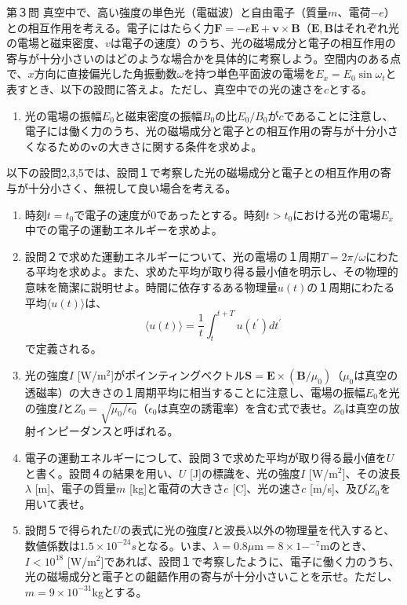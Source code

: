 \documentclass[fleqn]{jbook}
\begin{document}
\begin{question}{第３問}{}
真空中で、高い強度の単色光（電磁波）と自由電子（質量$m$、電荷$-e$）との相互作用を考える。電子にはたらく力$\mathbf{F}=-e\mathbf{E}+\mathbf{v}\times \mathbf{B}$（$\bm{E},\bm{B}$はそれぞれ光の電場と磁束密度、$v$は電子の速度）のうち、光の磁場成分と電子の相互作用の寄与が十分小さいのはどのような場合かを具体的に考察しよう。空間内のある点で、$x$方向に直接偏光した角振動数$\omega$を持つ単色平面波の電場を$E_x=E_0 \sin \omega_t$と表すとき、以下の設問に答えよ。ただし、真空中での光の速さを$c$とする。
\begin{enumerate}
\item 光の電場の振幅$E_0$と磁束密度の振幅$B_0$の比$E_0/B_0$が$c$であることに注意し、電子には働く力のうち、光の磁場成分と電子との相互作用の寄与が十分小さくなるための$\bm{v}$の大きさに関する条件を求めよ。
\end{enumerate}
以下の設問2,3,5では、設問１で考察した光の磁場成分と電子との相互作用の寄与が十分小さく、無視して良い場合を考える。
\setcounter{enumi}{2}
\begin{enumerate}
\item 時刻$t=t_0$で電子の速度が$0$であったとする。時刻$t>t_0$における光の電場$E_x$中での電子の運動エネルギーを求めよ。
\item 設問２で求めた運動エネルギーについて、光の電場の１周期$T=2\pi/\omega$にわたる平均を求めよ。また、求めた平均が取り得る最小値を明示し、その物理的意味を簡潔に説明せよ。時間に依存するある物理量$u(t)$の１周期にわたる平均$\langle u(t)\rangle$は、
$$
\langle u(t)\rangle=\frac{1}{t}\int_t^{t+T} u(t^{\prime})dt^{\prime}
$$
で定義される。

\item
光の強度$I$ [W/m$^2$]がポインティングベクトル$\bm{S}=\bm{E}\times (\bm{B}/\mu_0)$（$\mu_0$は真空の透磁率）の大きさの１周期平均に相当することに注意し、電場の振幅$E_0$を光の強度$I$と$Z_0=\sqrt{\mu_0/\epsilon_0}$（$\epsilon_0$は真空の誘電率）を含む式で表せ。$Z_0$は真空の放射インピーダンスと呼ばれる。

\item
電子の運動エネルギーにつして、設問３で求めた平均が取り得る最小値を$U$と書く。設問４の結果を用い、$U$ [J]の標識を、光の強度$I$ [W/m$^2$]、その波長$\lambda$ [m]、電子の質量$m$ [kg]と電荷の大きさ$e$ [C]、光の速さ$c$ [m/s]、及び$Z_0$を用いて表せ。

\item 
設問５で得られた$U$の表式に光の強度$I$と波長$\lambda$以外の物理量を代入すると、数値係数は$1.5\times 10^{-24} s$となる。いま、$\lambda=0.8 \mu\text{m}=8\times 1-^{-7}$mのとき、$I<10^{18}$ [W/m$^2$]であれば、設問１で考察したように、電子に働く力のうち、光の磁場成分と電子との齟齬作用の寄与が十分小さいことを示せ。ただし、$m=9\times10^{-31}$kgとする。
\end{enumerate}

\end{question}
\end{document}
